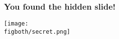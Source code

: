 \documentclass[aspectratio=169,handout]{beamer}
\begin{document}



\begin{frame}\label{fr:hidden}
	\frametitle{You found the hidden slide!}

\begin{center}
\texttt{[image: \\figboth/secret.png]}

\end{center}

\medbreak
	\hyperlink{fr:buttons}{}

\end{frame}
\end{document}
